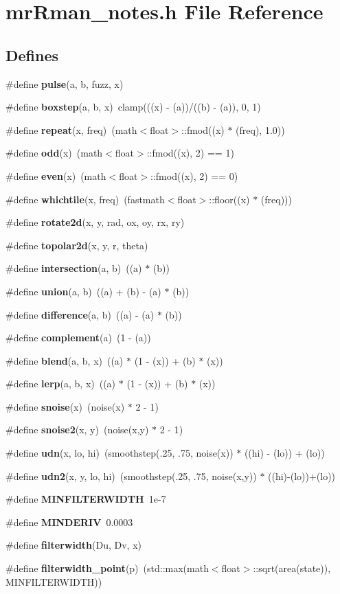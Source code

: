 \section{mr\-Rman\_\-notes.h File Reference}
\label{mrRman__notes_8h}
\subsection*{Defines}
\begin{CompactItemize}
\item 
\#define {\bf pulse}(a, b, fuzz, x)
\item 
\#define {\bf boxstep}(a, b, x)\ clamp(((x) - (a))/((b) - (a)), 0, 1)
\item 
\#define {\bf repeat}(x, freq)\ (math$<$float$>$::fmod((x) $\ast$ (freq), 1.0))
\item 
\#define {\bf odd}(x)\ (math$<$float$>$::fmod((x), 2) == 1)
\item 
\#define {\bf even}(x)\ (math$<$float$>$::fmod((x), 2) == 0)
\item 
\#define {\bf whichtile}(x, freq)\ (fastmath$<$float$>$::floor((x) $\ast$ (freq)))
\item 
\#define {\bf rotate2d}(x, y, rad, ox, oy, rx, ry)
\item 
\#define {\bf topolar2d}(x, y, r, theta)
\item 
\#define {\bf intersection}(a, b)\ ((a) $\ast$ (b))
\item 
\#define {\bf union}(a, b)\ ((a) + (b) - (a) $\ast$ (b))
\item 
\#define {\bf difference}(a, b)\ ((a) - (a) $\ast$ (b))
\item 
\#define {\bf complement}(a)\ (1 - (a))
\item 
\#define {\bf blend}(a, b, x)\ ((a) $\ast$ (1 - (x)) + (b) $\ast$ (x))
\item 
\#define {\bf lerp}(a, b, x)\ ((a) $\ast$ (1 - (x)) + (b) $\ast$ (x))
\item 
\#define {\bf snoise}(x)\ (noise(x) $\ast$ 2 - 1)
\item 
\#define {\bf snoise2}(x, y)\ (noise(x,y) $\ast$ 2 - 1)
\item 
\#define {\bf udn}(x, lo, hi)\ (smoothstep(.25, .75, noise(x)) $\ast$ ((hi) - (lo)) + (lo))
\item 
\#define {\bf udn2}(x, y, lo, hi)\ (smoothstep(.25, .75, noise(x,y)) $\ast$ ((hi)-(lo))+(lo))
\item 
\#define {\bf MINFILTERWIDTH}\ 1e-7
\item 
\#define {\bf MINDERIV}\ 0.0003
\item 
\#define {\bf filterwidth}(Du, Dv, x)
\item 
\#define {\bf filterwidth\_\-point}(p)\ (std::max(math$<$float$>$::sqrt(area(state)), MINFILTERWIDTH))
\end{CompactItemize}


